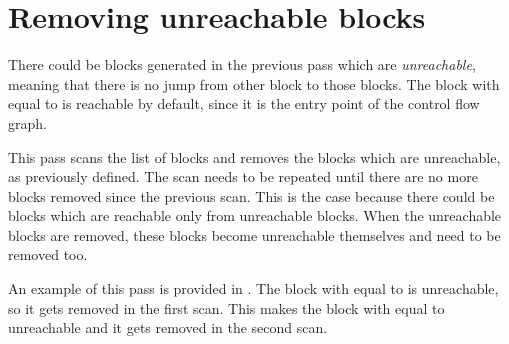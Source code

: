 \section{Removing unreachable blocks}

There could be blocks generated in the previous pass which are \textit{unreachable}, meaning that there is no jump from
other block to those blocks. The block with  equal to  is reachable by default, since it is the entry
point of the control flow graph.

This pass scans the list of blocks and removes the blocks which are unreachable, as previously defined. The scan needs
to be repeated until there are no more blocks removed since the previous scan. This is the case because there could be
blocks which are reachable only from unreachable blocks. When the unreachable blocks are removed, these blocks become
unreachable themselves and need to be removed too.

An example of this pass is provided in . The block with  equal to
 is unreachable, so it gets removed in the first scan. This makes the block with  equal to 
unreachable and it gets removed in the second scan.

